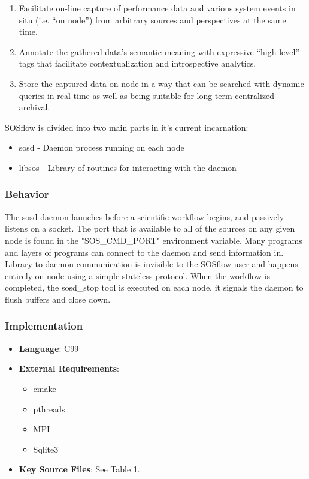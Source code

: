 \begin{enumerate}
\item Facilitate on-line capture of performance data and various system
  events in situ (i.e. ``on node'') from arbitrary sources and
  perspectives at the same time.
\item Annotate the gathered data's semantic meaning with expressive
  ``high-level'' tags that facilitate contextualization and
  introspective analytics.
\item Store the captured data on node in a way that can be searched
  with dynamic queries in real-time as well as being suitable for
  long-term centralized archival.
\end{enumerate}

SOSflow is divided into two main parts in it's current incarnation:
\begin{itemize}
\item sosd - Daemon process running on each node
\item libsos - Library of routines for interacting with the daemon
\end{itemize}

\subsubsection{Behavior}
The sosd daemon launches before a scientific workflow begins, and
passively listens on a socket.  The port that is available to all of
the sources on any given node is found in the "SOS\_CMD\_PORT"
environment variable.  Many programs and layers of programs can
connect to the daemon and send information in. Library-to-daemon
communication is invisible to the SOSflow user and happens entirely
on-node using a simple stateless protocol.  When the workflow is
completed, the sosd\_stop tool is executed on each node, it signals
the daemon to flush buffers and close down.



\subsubsection{Implementation}
\begin{itemize}
  \item \textbf{Language}: C99
   \item \textbf{External Requirements}:
   \begin{itemize}
    \item cmake
    \item pthreads
    \item MPI
    \item Sqlite3
    \end{itemize}
  \item \textbf{Key Source Files}: See Table 1.
\end{itemize}

